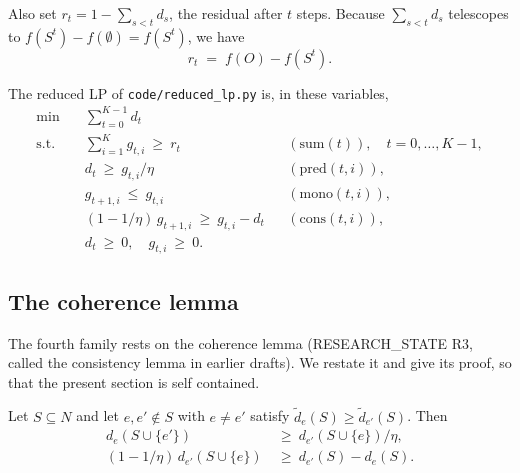 Also set $r_{t} = 1 - \sum_{s<t} d_{s}$, the residual after $t$ steps. Because
$\sum_{s<t} d_{s}$ telescopes to $f(S^{t}) - f(\emptyset) = f(S^{t})$, we have
\begin{equation}
\label{eq:residual}
r_{t} \;=\; f(O) - f(S^{t}).
\end{equation}

The reduced LP of \texttt{code/reduced\_lp.py} is, in these variables,
\begin{equation}
\label{eq:redlp}
\begin{aligned}
\min \quad & \textstyle\sum_{t=0}^{K-1} d_{t}\\
\text{s.t.} \quad
& \textstyle\sum_{i=1}^{K} g_{t,i} \ \ge\ r_{t}
&& (\mathrm{sum}(t)), \quad t = 0,\dots,K-1,\\
& d_{t} \ \ge\ g_{t,i}/\eta
&& (\mathrm{pred}(t,i)),\\
& g_{t+1,i} \ \le\ g_{t,i}
&& (\mathrm{mono}(t,i)),\\
& (1 - 1/\eta)\, g_{t+1,i} \ \ge\ g_{t,i} - d_{t}
&& (\mathrm{cons}(t,i)),\\
& d_{t} \ \ge\ 0, \quad g_{t,i} \ \ge\ 0 .
\end{aligned}
\end{equation}

\subsection{The coherence lemma}

The fourth family rests on the coherence lemma (RESEARCH\_STATE R3, called the
consistency lemma in earlier drafts). We restate it and give its proof, so that
the present section is self contained.

\begin{lemma}[coherence, R3]
\label{lem:coherence}
Let $S \subseteq N$ and let $e, e' \notin S$ with $e \ne e'$ satisfy
$\tilde d_{e}(S) \ge \tilde d_{e'}(S)$. Then
\begin{align}
d_{e}(S \cup \{e'\}) &\ \ge\ d_{e'}(S \cup \{e\}) / \eta,
\label{eq:coh-i}\\
(1 - 1/\eta)\, d_{e'}(S \cup \{e\}) &\ \ge\ d_{e'}(S) - d_{e}(S).
\label{eq:coh-ii}
\end{align}
\end{lemma}

